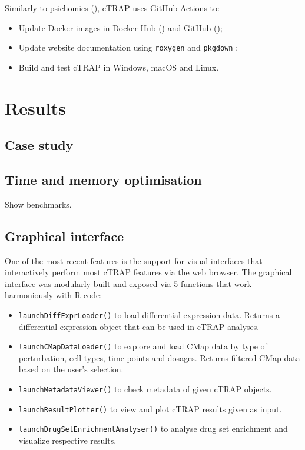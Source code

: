 Similarly to psichomics (), cTRAP uses GitHub Actions to:
\begin{itemize}
	\item Update Docker images in Docker Hub () and GitHub ();
	\item Update website documentation using \texttt{roxygen} \cite{wickham:2021wt} and \texttt{pkgdown} \cite{wickham:2021wj};
	\item Build and test cTRAP in Windows, macOS and Linux.
\end{itemize}

\section{Results}

\subsection{Case study}

\subsection{Time and memory optimisation}

Show benchmarks.

\subsection{Graphical interface}

One of the most recent features is the support for visual interfaces that interactively perform most cTRAP features via the web browser. The graphical interface was modularly built and exposed via 5 functions that work harmoniously with R code:

\begin{itemize}
	\item \texttt{launchDiffExprLoader()} to load differential expression data. Returns a differential expression object that can be used in cTRAP analyses.
	\item \texttt{launchCMapDataLoader()} to explore and load CMap data by type of perturbation, cell types, time points and dosages. Returns filtered CMap data based on the user's selection.
	\item \texttt{launchMetadataViewer()} to check metadata of given cTRAP objects.
	\item \texttt{launchResultPlotter()} to view and plot cTRAP results given as input.
	\item \texttt{launchDrugSetEnrichmentAnalyser()} to analyse drug set enrichment and visualize respective results.
\end{itemize}

